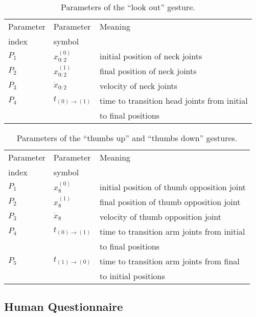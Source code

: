 \begin{table}
\centering
\caption{Parameters of the ``look out'' gesture.}
\begin{tabular}{*{3}{l}} %
\toprule
Parameter       & Parameter         & Meaning \\
index           & symbol            & \\
\midrule
$P_1$           & $x_{0:2}^{(0)}$   & initial position of neck joints\\
$P_2$           & $x_{0:2}^{(1)}$   & final position of neck joints\\
$P_3$           & $\dot{x}_{0:2}$   & velocity of neck joints \\
$P_4$           & $t_{(0)\to(1)}$   & time to transition head joints from initial \\
                &                   & to final positions \\
\bottomrule
\end{tabular}
\label{tab:gesture_params:look_out}
\end{table}

\begin{table}
\centering
\caption{Parameters of the ``thumbs up'' and ``thumbs down'' gestures.}
\begin{tabular}{*{3}{l}} %
\toprule
Parameter       & Parameter         & Meaning \\
index           & symbol            & \\
\midrule
$P_1$           & $x_8^{(0)}$       & initial position of thumb opposition joint \\
$P_2$           & $x_8^{(1)}$       & final position of thumb opposition joint \\
$P_3$           & $\dot{x}_8$       & velocity of thumb opposition joint \\
$P_4$           & $t_{(0)\to(1)}$   & time to transition arm joints from initial \\
                &                   & to final positions \\
$P_5$           & $t_{(1)\to(0)}$   & time to transition arm joints from final \\
                &                   & to initial positions \\
\bottomrule
\end{tabular}
\label{tab:gesture_params:thumbs_up-thumbs_down}
\end{table}

\subsection{Human Questionnaire}
\label{sec:questionnaire}

